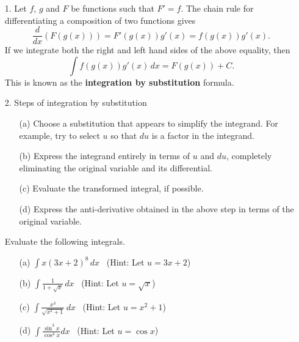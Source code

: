 \documentclass[12pt]{article}
\newenvironment{examples}{\noindent{\bf Examples }}{\vspace{0mm}}
\newcommand{\ds}{\displaystyle}
\begin{document}
\begin{enumerate}
\item[1.]
Let $f$, $g$ and $F$ be functions such that $F' = f$. The chain rule for differentiating a composition of two functions gives
$$
\frac{d}{dx}\left(F(g(x))\right) = F'\left(g(x)\right)g'(x) = f\left(g(x)\right)g'(x).
$$
If we integrate both the right and left hand sides of the above equality, then
\begin{equation}\label{eq4.2}
\int f\left(g(x)\right)g'(x) \, dx = F(g(x)) + C.
\end{equation}
This is known as the {\bf integration by substitution} formula.

\item[2.]
Steps of integration by substitution
\begin{enumerate}
\item[(a)]
Choose a substitution that appears to simplify the integrand. For example, try to select $u$ so that $du$ is a factor in the integrand.
\item[(b)]
Express the integrand entirely in terms of $u$ and $du$, completely eliminating the original variable and its differential.
\item[(c)]
Evaluate the transformed integral, if possible.
\item[(d)]
Express the anti-derivative obtained in the above step in terms of the original variable.
\end{enumerate}

\vspace{0.3cm}

\begin{examples}
Evaluate the following integrals.
\begin{enumerate}
\item[(a)]
$\ds \int x(3x+2)^8 \, dx$ \, ({\sf Hint: Let $u = 3x+2$})
\item[(b)]
$\ds \int \frac{1}{1 + \sqrt{x}} \, dx$ \, ({\sf Hint: Let $u = \sqrt{x}$})
\item[(c)]
$\ds \int \frac{x^3}{\sqrt{x^2 + 1}} \, dx$ \, ({\sf Hint: Let $u = x^2 + 1$})
\item[(d)]
$\ds \int \frac{\sin^3 x}{\cos^4 x} dx$ \, ({\sf Hint: Let $u = \cos x$})
\end{enumerate}

\vspace{0.2cm}


\end{examples}
\end{enumerate}
\end{document}
